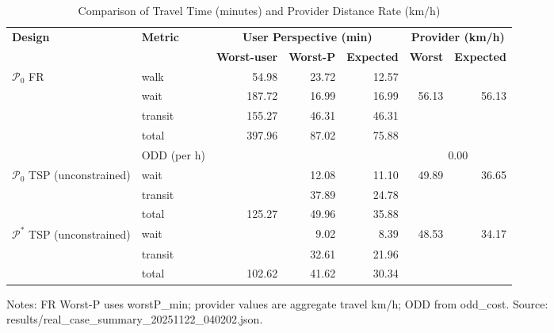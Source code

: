 \begin{table}[t]
\centering
\caption{Comparison of Travel Time (minutes) and Provider Distance Rate (km/h)}
\begin{tabular}{l l r r r r r}
\toprule
\textbf{Design} & \textbf{Metric} & 
\multicolumn{3}{c}{\textbf{User Perspective (min)}} & 
\multicolumn{2}{c}{\textbf{Provider (km/h)}} \\
\cmidrule(lr){3-5}\cmidrule(lr){6-7}
& & \textbf{Worst-user} & \textbf{Worst-P} & \textbf{Expected} & \textbf{Worst} & \textbf{Expected} \\
\midrule
$\mathcal{P}_0$ FR & walk    & 54.98 & 23.72 & 12.57 &        &        \\
                   & wait    & 187.72 & 16.99 & 16.99 & 56.13  & 56.13  \\
                   & transit & 155.27 & 46.31 & 46.31 &        &        \\
                   & total   & 397.96 & 87.02 & 75.88 &       &        \\
                   & ODD (per h) &  &  &  & \multicolumn{2}{c}{0.00} \\
\midrule
$\mathcal{P}_0$ TSP (unconstrained) & wait    &  & 12.08 & 11.10 & 49.89 & 36.65 \\
                                    & transit &  & 37.89 & 24.78 &        &       \\
                                    & total   & 125.27 & 49.96 & 35.88 &        &       \\
\midrule
$\mathcal{P}^*$ TSP (unconstrained) & wait    &  & 9.02 & 8.39 & 48.53 & 34.17 \\
                                    & transit &  & 32.61 & 21.96 &        &       \\
                                    & total   & 102.62 & 41.62 & 30.34 &        &       \\
\bottomrule
\end{tabular}

\vspace{0.5ex}
\small
Notes: FR Worst-P uses worstP\_min; provider values are aggregate travel km/h; ODD from odd\_cost. Source: results/real_case_summary_20251122_040202.json.
\end{table}